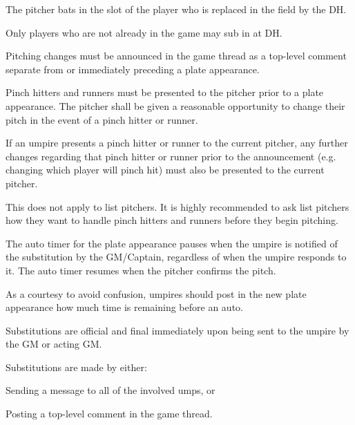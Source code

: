 \begin{deepEnumerate}
\begin{deepEnumerate}
\begin{deepEnumerate}
\begin{deepEnumerate}
				The pitcher bats in the slot of the player who is replaced in the field by the DH.
				\item Only players who are not already in the game may sub in at DH.
			\end{deepEnumerate}
		\end{deepEnumerate}
		\item Pitching changes must be announced in the game thread as a top-level comment separate from or immediately preceding a plate appearance.
		\item Pinch hitters and runners must be presented to the pitcher prior to a plate appearance. 
		The pitcher shall be given a reasonable opportunity to change their pitch in the event of a pinch hitter or runner.
		\begin{deepEnumerate}
			\item If an umpire presents a pinch hitter or runner to the current pitcher, any further changes regarding that pinch hitter or runner prior to the announcement 
			(e.g. changing which player will pinch hit) must also be presented to the current pitcher.
			\item This does not apply to list pitchers. It is highly recommended to ask list pitchers how they want to handle pinch hitters and runners before they begin pitching.
			\item The auto timer for the plate appearance pauses when the umpire is notified of the substitution by the GM/Captain, 
			regardless of when the umpire responds to it. The auto timer resumes when the pitcher confirms the pitch.
			\begin{deepEnumerate}
				\item As a courtesy to avoid confusion, umpires should post in the new plate appearance how much time is remaining before an auto.
			\end{deepEnumerate}
		\end{deepEnumerate}
		\item Substitutions are official and final immediately upon being sent to the umpire by the GM or acting GM.
		\begin{deepEnumerate}
			\item Substitutions are made by either:
			\begin{deepEnumerate}
				\item Sending a message to all of the involved umps, or 
				\item Posting a top-level comment in the game thread.
			\end{deepEnumerate}

\end{deepEnumerate}
\end{deepEnumerate}
\end{deepEnumerate}

